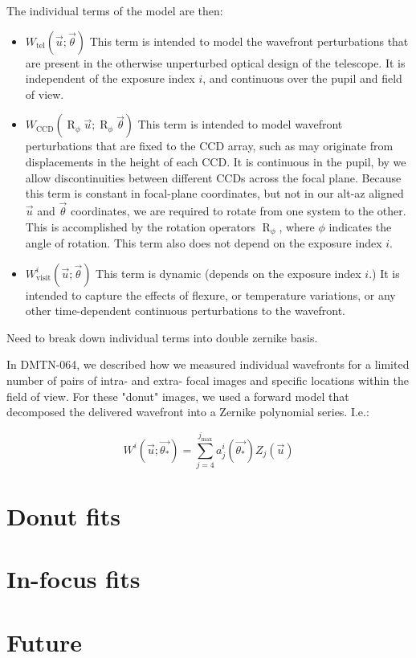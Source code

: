 \documentclass{article}
\DeclareMathOperator{\R}{R}
\begin{document}
The individual terms of the model are then:

\begin{itemize}

  \item $W_\mathrm{tel}\left(\vec{u}; \vec{\theta}\right)$  This term is
  intended to model the wavefront perturbations that are present in the
  otherwise unperturbed optical design of the telescope.  It is independent of
  the exposure index $i$, and continuous over the pupil and field of view.

  \item $W_\mathrm{CCD}\left(\R_\phi \vec{u}; \R_\phi \vec{\theta}\right)$  This
  term is intended to model wavefront perturbations that are fixed to the CCD
  array, such as may originate from displacements in the height of each CCD.  It
  is continuous in the pupil, by we allow discontinuities between different CCDs
  across the focal plane.  Because this term is constant in focal-plane
  coordinates, but not in our alt-az aligned $\vec{u}$ and $\vec{\theta}$
  coordinates, we are required to rotate from one system to the other.  This is
  accomplished by the rotation operators $\R_\phi$, where $\phi$ indicates the
  angle of rotation.  This term also does not depend on the exposure index $i$.

  \item $W_\mathrm{visit}^i\left(\vec{u}; \vec{\theta}\right)$  This term is
  dynamic (depends on the exposure index $i$.)  It is intended to capture the
  effects of flexure, or temperature variations, or any other time-dependent
  continuous perturbations to the wavefront.

\end{itemize}

Need to break down individual terms into double zernike basis.

In DMTN-064, we described how we measured individual wavefronts for a limited
number of pairs of intra- and extra- focal images and specific locations within
the field of view.  For these "donut" images, we used a forward model that
decomposed the delivered wavefront into a Zernike polynomial series.  I.e.:

\begin{equation}
    W^i\left(\vec{u}; \vec{\theta_\ast}\right) = \sum_{j=4}^{j_\mathrm{max}} a_j^i(\vec{\theta_\ast}) Z_j(\vec{u})
\end{equation}



\section{Donut fits}
\section{In-focus fits}
\section{Future}
\end{document}
